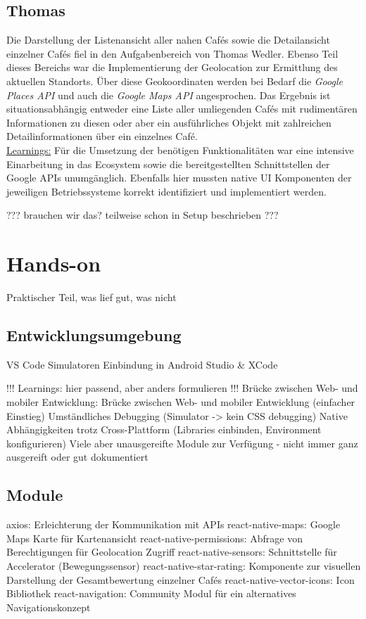 \subsection{Thomas}
Die Darstellung der Listenansicht aller nahen Cafés sowie die Detailansicht einzelner Cafés fiel in den Aufgabenbereich von Thomas Wedler.
Ebenso Teil dieses Bereichs war die Implementierung der Geolocation zur Ermittlung des aktuellen Standorts.
Über diese Geokoordinaten werden bei Bedarf die \emph{Google Places API} und auch die \emph{Google Maps API} angesprochen.
Das Ergebnis ist situationsabhängig entweder eine Liste aller umliegenden Cafés mit rudimentären Informationen zu diesen oder aber ein ausführliches Objekt mit zahlreichen Detailinformationen über ein einzelnes Café.
\\
\underline{Learnings:}
Für die Umsetzung der benötigen Funktionalitäten war eine intensive Einarbeitung in das Ecosystem sowie die bereitgestellten Schnittstellen der Google APIs unumgänglich.
Ebenfalls hier mussten native UI Komponenten der jeweiligen Betriebssysteme korrekt identifiziert und implementiert werden.







??? brauchen wir das? teilweise schon in Setup beschrieben ???

\section{Hands-on}
Praktischer Teil, was lief gut, was nicht

\subsection{Entwicklungsumgebung}
VS Code
Simulatoren
Einbindung in Android Studio \& XCode

!!! Learnings: hier passend, aber anders formulieren !!!
Brücke zwischen Web- und mobiler Entwicklung: Brücke zwischen Web- und mobiler Entwicklung (einfacher Einstieg)
Umständliches Debugging (Simulator -> kein CSS debugging)
Native Abhängigkeiten trotz Cross-Plattform (Libraries einbinden, Environment konfigurieren)
Viele aber unausgereifte Module zur Verfügung - nicht immer ganz ausgereift oder gut dokumentiert

\subsection{Module}
axios: Erleichterung der Kommunikation mit APIs
react-native-maps: Google Maps Karte für Kartenansicht
react-native-permissions: Abfrage von Berechtigungen für Geolocation Zugriff
react-native-sensors: Schnittstelle für Accelerator (Bewegungssensor)
react-native-star-rating: Komponente zur visuellen Darstellung der Gesamtbewertung einzelner Cafés
react-native-vector-icons: Icon Bibliothek
react-navigation: Community Modul für ein alternatives Navigationskonzept

